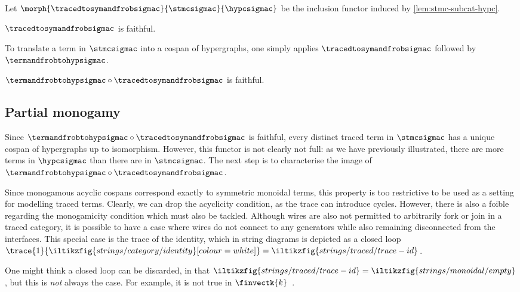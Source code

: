 \begin{definition}
    Let \(\morph{\tracedtosymandfrobsigmac}{\stmcsigmac}{\hypcsigmac}\) be the
    inclusion functor induced by \cref{lem:stmc-subcat-hypc}.
\end{definition}

\begin{corollary}
    \(\tracedtosymandfrobsigmac\) is faithful.
\end{corollary}

To translate a term in \(\stmcsigmac\) into a cospan of hypergraphs, one simply
applies \(\tracedtosymandfrobsigmac\) followed by \(\termandfrobtohypsigmac\).

\begin{corollary}
    \(\termandfrobtohypsigmac \circ \tracedtosymandfrobsigmac\) is faithful.
\end{corollary}

\subsection{Partial monogamy}

Since \(\termandfrobtohypsigmac \circ \tracedtosymandfrobsigmac\) is faithful,
every distinct traced term in \(\stmcsigmac\) has a unique cospan of
hypergraphs up to isomorphism.
However, this functor is not clearly not full: as we have previously
illustrated, there are more terms in \(\hypcsigmac\) than there are in
\(\stmcsigmac\).
The next step is to characterise the image of
\(\termandfrobtohypsigmac \circ \tracedtosymandfrobsigmac\).

Since monogamous acyclic cospans correspond exactly to symmetric monoidal terms,
this property is too restrictive to be used as a setting for modelling traced
terms.
Clearly, we can drop the acyclicity condition, as the trace can introduce
cycles.
However, there is also a foible regarding the monogamicity condition which must
also be tackled.
Although wires are also not permitted to arbitrarily fork or join in a traced
category, it is possible to have a case where wires do not connect to
any generators while also remaining disconnected from the interfaces.
This special case is the trace of the identity, which in string diagrams is
depicted as a closed
loop \(
    \trace{1}{\iltikzfig{strings/category/identity}[colour=white]}
    =
    \iltikzfig{strings/traced/trace-id}
\).

\begin{remark}
    One might think a closed loop can be discarded, in that \(
        \iltikzfig{strings/traced/trace-id}
        =
        \iltikzfig{strings/monoidal/empty}
    \), but this is \emph{not} always the case.
    For example, it is not true in
    \(\finvectk{k}\)~\cite[Sec. 6.1]{hasegawa1997recursion}.
\end{remark}

